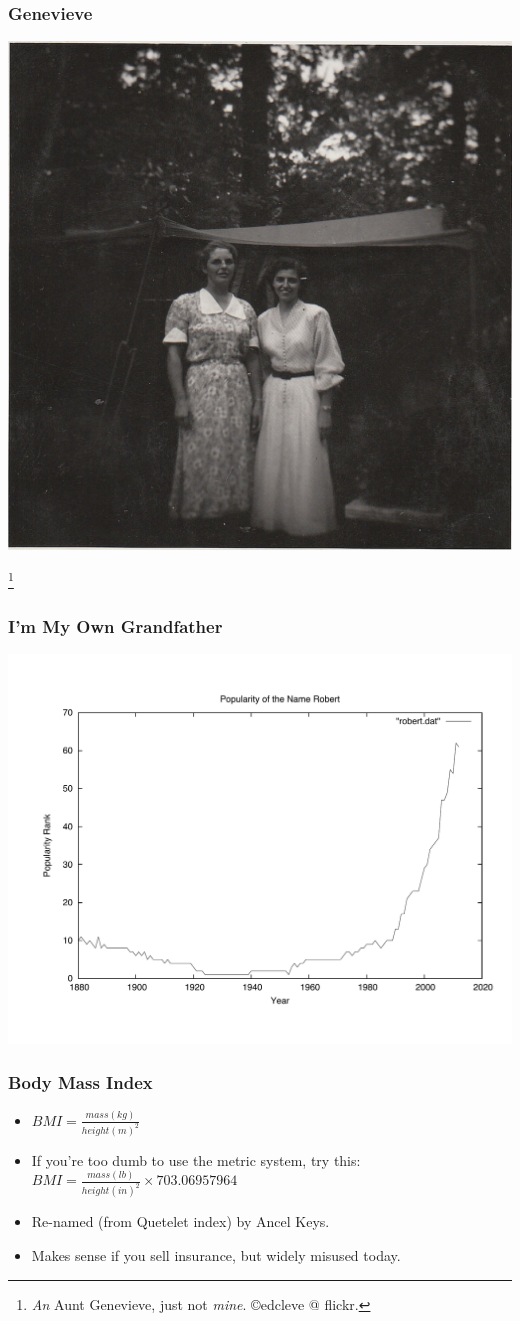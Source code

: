 \documentclass{beamer}
\begin{document}

\begin{frame}
	\frametitle{Genevieve}
    \begin{center}
        \includegraphics[width=0.5\hsize]{art/auntgenevieve}
    \end{center}
\footnote{\emph{An} Aunt Genevieve, just not \emph{mine}.  \copyright edcleve @ flickr.}
\end{frame}

\begin{frame}
	\frametitle{I'm My Own Grandfather}
    \begin{center}
        \includegraphics[width=0.8\hsize]{art/robertyears}
    \end{center}
\end{frame}


\begin{frame}
	\frametitle{Body Mass Index}
	\begin{itemize}
        \item $BMI = \frac{mass(kg)}{height(m)^2}$
        \item<2-> If you're too dumb to use the metric system, try this:
            $BMI = \frac{mass(lb)}{height(in)^2}\times703.06957964$
        \item<3-> Re-named (from Quetelet index) by Ancel Keys.
        \item<4-> Makes sense if you sell insurance, but widely misused today.
    \end{itemize}
\end{frame}
\end{document}

